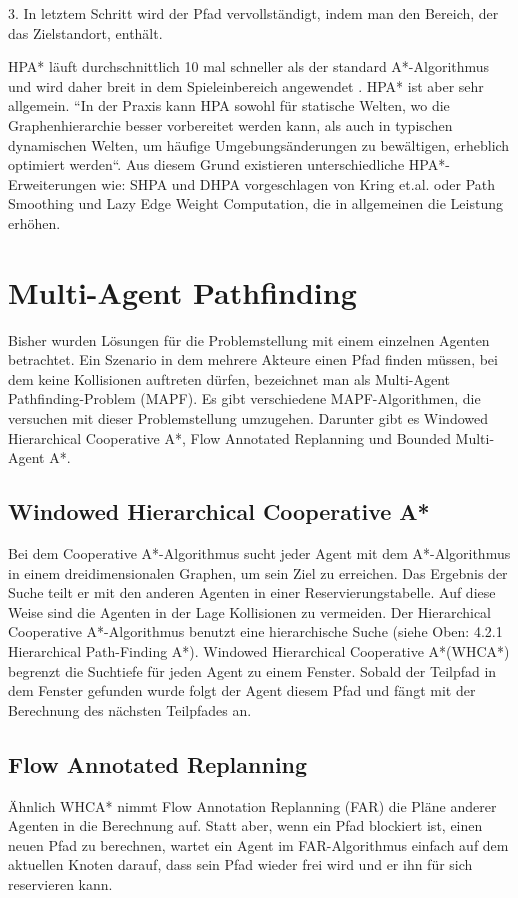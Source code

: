 3. In letztem Schritt wird der Pfad vervollständigt, indem man den Bereich, der das Zielstandort, enthält.\\
\begin{sloppypar}
HPA* läuft durchschnittlich 10 mal schneller als der standard A*-Algorithmus \cite{hpa} und wird daher breit in dem Spieleinbereich angewendet \cite{LeDuc.2008}. HPA* ist aber sehr allgemein. ``In der Praxis kann HPA sowohl für statische Welten, wo die Graphenhierarchie besser vorbereitet werden kann, als auch in typischen dynamischen Welten, um häufige Umgebungsänderungen zu bewältigen, erheblich optimiert werden``\cite{dshpa}. Aus diesem Grund existieren unterschiedliche  HPA*-Erweiterungen wie: SHPA und DHPA vorgeschlagen von Kring et.al.\cite{dshpa} oder Path Smoothing und Lazy Edge Weight Computation, die in allgemeinen die Leistung erhöhen\cite{hpaEnch}.
\end{sloppypar}



\section{Multi-Agent Pathfinding}
Bisher wurden Lösungen für die Problemstellung mit einem einzelnen Agenten betrachtet. Ein Szenario in dem mehrere Akteure einen Pfad finden müssen, bei dem keine Kollisionen auftreten dürfen, bezeichnet man als Multi-Agent Pathfinding-Problem (MAPF). Es gibt verschiedene MAPF-Algorithmen, die versuchen mit dieser Problemstellung umzugehen. Darunter gibt es Windowed Hierarchical Cooperative A*, Flow Annotated Replanning und Bounded Multi-Agent A*.

\subsection{Windowed Hierarchical Cooperative A*}
Bei dem Cooperative A*-Algorithmus sucht jeder Agent mit dem A*-Algorithmus in einem dreidimensionalen Graphen, um sein Ziel zu erreichen. Das Ergebnis der Suche teilt er mit den anderen Agenten in einer Reservierungstabelle. Auf diese Weise sind die Agenten in der Lage Kollisionen zu vermeiden. Der Hierarchical Cooperative A*-Algorithmus benutzt eine hierarchische Suche (siehe Oben: 4.2.1 Hierarchical Path-Finding A*). Windowed Hierarchical Cooperative A*(WHCA*) begrenzt die Suchtiefe für jeden Agent zu einem Fenster. Sobald der Teilpfad in dem Fenster gefunden wurde folgt der Agent diesem Pfad und fängt mit der Berechnung des nächsten Teilpfades an. 
\subsection{Flow Annotated Replanning}
Ähnlich WHCA* nimmt Flow Annotation Replanning (FAR) die Pläne anderer Agenten in die Berechnung auf. Statt aber, wenn ein Pfad blockiert ist, einen neuen Pfad zu berechnen, wartet ein Agent im FAR-Algorithmus einfach auf dem aktuellen Knoten darauf, dass sein Pfad wieder frei wird und er ihn für sich reservieren kann. 

